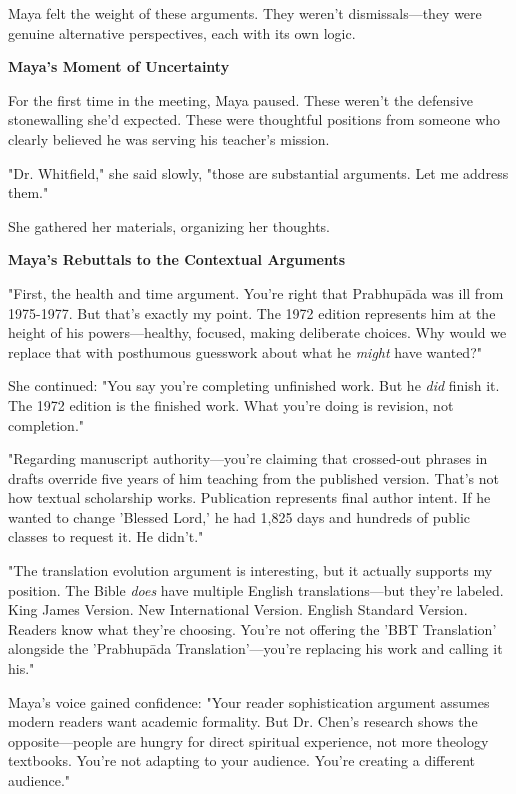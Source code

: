 \documentclass[12pt,twoside]{book}
\begin{document}
Maya felt the weight of these arguments. They weren't dismissals—they were genuine alternative perspectives, each with its own logic.

\textbf{\textbf{Maya's Moment of Uncertainty}}

For the first time in the meeting, Maya paused. These weren't the defensive stonewalling she'd expected. These were thoughtful positions from someone who clearly believed he was serving his teacher's mission.

"Dr. Whitfield," she said slowly, "those are substantial arguments. Let me address them."

She gathered her materials, organizing her thoughts.

\textbf{\textbf{Maya's Rebuttals to the Contextual Arguments}}

"First, the health and time argument. You're right that Prabhupāda was ill from 1975-1977. But that's exactly my point. The 1972 edition represents him at the height of his powers—healthy, focused, making deliberate choices. Why would we replace that with posthumous guesswork about what he \emph{might} have wanted?"

She continued: "You say you're completing unfinished work. But he \emph{did} finish it. The 1972 edition is the finished work. What you're doing is revision, not completion."

"Regarding manuscript authority—you're claiming that crossed-out phrases in drafts override five years of him teaching from the published version. That's not how textual scholarship works. Publication represents final author intent. If he wanted to change 'Blessed Lord,' he had 1,825 days and hundreds of public classes to request it. He didn't."

"The translation evolution argument is interesting, but it actually supports my position. The Bible \emph{does} have multiple English translations—but they're labeled. King James Version. New International Version. English Standard Version. Readers know what they're choosing. You're not offering the 'BBT Translation' alongside the 'Prabhupāda Translation'—you're replacing his work and calling it his."

Maya's voice gained confidence: "Your reader sophistication argument assumes modern readers want academic formality. But Dr. Chen's research shows the opposite—people are hungry for direct spiritual experience, not more theology textbooks. You're not adapting to your audience. You're creating a different audience."
\end{document}
